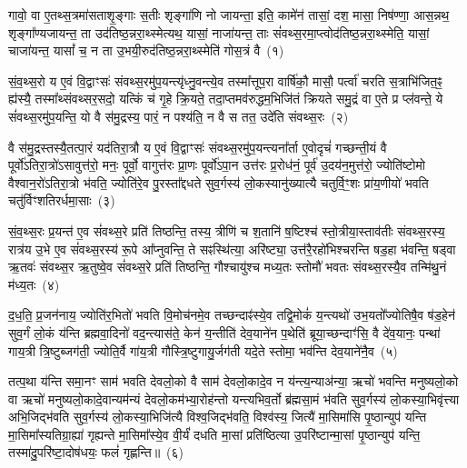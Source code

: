 \setcounter{anuvakam}{0}
गावो॒ वा ए॒तथ्स॒त्रमा॑सताशृ॒ङ्गाः स॒तीः शृङ्गा॑णि नो जायन्ता॒ इति॒ कामे॑न॑ तासां॒ दश॒ मासा॒ निष॑ण्णा॒ आस॒न्नथ॒ शृङ्गा᳚ण्यजायन्त॒ ता उद॑तिष्ठ॒न्नरा॒थ्स्मेत्यथ॒ यासां॒ नाजा॑यन्त॒ ताः सं॑वथ्स॒रमा॒प्त्वोद॑तिष्ठ॒न्नरा॒थ्स्मेति॒ यासां॒ चाजा॑यन्त॒ यासां᳚ च॒ न ता उ॒भयी॒रुद॑तिष्ठ॒न्नरा॒थ्स्मेति॑ गोस॒त्रं वै~(१)\ip

सं॒व॒थ्स॒रो य ए॒वं वि॒द्वाꣳसः॑ संवथ्स॒रमु॑प॒यन्त्यृ॑ध्नु॒वन्त्ये॒व तस्मा᳚त्तूप॒रा वार्\mbox{}षि॑कौ॒ मासौ॒ पर्त्वा॑ चरति स॒त्राभि॑जित॒ꣴ॒ ह्य॑स्यै॒ तस्मा᳚थ्संवथ्सर॒सदो॒ यत्किं च॑ गृ॒हे क्रि॒यते॒ तदा॒प्तमव॑रुद्धम॒भिजि॑तं क्रियते समु॒द्रं वा ए॒ते प्र प्ल॑वन्ते॒ ये सं॑वथ्स॒रमु॑प॒यन्ति॒ यो वै स॑मु॒द्रस्य॒ पारं॒ न पश्य॑ति॒ न वै स तत॒ उदे॑ति संवथ्स॒रः~(२)\ip

वै स॑मु॒द्रस्तस्यै॒तत्पा॒रं यद॑तिरा॒त्रौ य ए॒वं वि॒द्वाꣳसः॑ संवथ्स॒रमु॑प॒यन्त्यना᳚र्ता ए॒वोदृचं॑ गच्छन्ती॒यं वै पूर्वो॑\-ऽतिरा॒त्रो॑\-ऽ\-सावुत्त॑रो॒ मनः॒ पूर्वो॒ वागुत्त॑रः प्रा॒णः पूर्वो॑\-ऽपा॒न उत्त॑रः प्र॒रोध॑नं॒ पूर्व॑ उ॒दय॑न॒मुत्त॑रो॒ ज्योति॑ष्टोमो वैश्वान॒रो॑\-ऽतिरा॒त्रो भ॑वति॒ ज्योति॑रे॒व पु॒रस्ता᳚द्दधते सुव॒र्गस्य॑ लो॒कस्यानु॑ख्यात्यै चतुर्वि॒ꣳ॒शः प्रा॑य॒णीयो॑ भवति चतु॑र्विꣳशतिरर्धमा॒साः~(३)\ip

सं॒व॒थ्स॒रः प्र॒यन्त॑ ए॒व सं॑वथ्स॒रे प्रति॑ तिष्ठन्ति॒ तस्य॒ त्रीणि॑ च श॒तानि॑ ष॒ष्टिश्च॑ स्तो॒त्रीया॒स्ताव॑तीः संवथ्स॒रस्य॒ रात्र॑य उ॒भे ए॒व सं॑वथ्स॒रस्य॑ रू॒पे आ᳚प्नुवन्ति॒ ते सꣴस्थि॑त्या॒ अरि॑ष्ट्या॒ उत्त॑रै॒रहो॑भिश्चरन्ति षड॒हा भ॑वन्ति॒ षड्वा ऋ॒तवः॑ संवथ्स॒र ऋ॒तुष्वे॒व सं॑वथ्स॒रे प्रति॑ तिष्ठन्ति॒ गौश्चायु॑श्च मध्य॒तः स्तोमौ॑ भवतः संवथ्स॒रस्यै॒व तन्मि॑थु॒नं म॑ध्य॒तः~(४)\ip

द॒ध॒ति॒ प्र॒जन॑नाय॒ ज्योति॑र॒भितो॑ भवति वि॒मोच॑नमे॒व तच्छन्दाꣴ॑स्ये॒व तद्वि॒मोकं॑ य॒न्त्यथो॑ उभ॒यतो᳚ज्योतिषै॒व ष॑ड॒हेन॑ सुव॒र्गं लो॒कं य॑न्ति ब्रह्मवा॒दिनो॑ वद॒न्त्यास॑ते॒ केन॑ य॒न्तीति॑ देव॒याने॑न प॒थेति॑ ब्रूया॒च्छन्दाꣳ॑सि॒ वै दे॑व॒यानः॒ पन्था॑ गाय॒त्री त्रि॒ष्टुब्जग॑ती॒ ज्योति॒र्वै गा॑य॒त्री गौस्त्रि॒ष्टुगायु॒र्जग॑ती यदे॒ते स्तोमा॒ भव॑न्ति देव॒याने॑नै॒व~(५)\ip

तत्प॒था य॑न्ति समा॒नꣳ साम॑ भवति देवलो॒को वै साम॑ देवलो॒कादे॒व न य॑न्त्य॒न्याअ॑न्या॒ ऋचो॑ भवन्ति मनुष्यलो॒को वा ऋचो॑ मनुष्यलो॒कादे॒वान्यम॑न्यं देवलो॒कम॑भ्या॒रोह॑न्तो यन्त्यभिव॒र्तो ब्र॑ह्मसा॒मं भ॑वति सुव॒र्गस्य॑ लो॒कस्या॒भिवृ॑त्त्या अभि॒जिद्भ॑वति सुव॒र्गस्य॑ लो॒कस्या॒भिजि॑त्यै विश्व॒जिद्भ॑वति॒ विश्व॑स्य॒ जित्यै॑ मा॒सिमा॑सि पृ॒ष्ठान्युप॑ यन्ति मा॒सिमा᳚स्यतिग्रा॒ह्या॑ गृह्यन्ते मा॒सिमा᳚स्ये॒व वी॒र्यं॑ दधति मा॒सां प्रति॑ष्ठित्या उ॒परि॑ष्टान्मा॒सां पृ॒ष्ठान्युप॑ यन्ति॒ तस्मा॑दु॒परि॑ष्टा॒दोष॑धयः॒ फलं॑ गृह्णन्ति॥~(६)\ip

